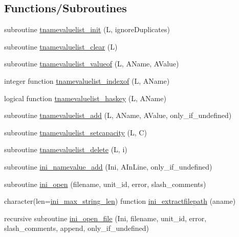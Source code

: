 \subsection*{Functions/\+Subroutines}
\begin{DoxyCompactItemize}
\item 
subroutine \mbox{\hyperlink{namespaceinifile_a1b5283277321bb0c12d8495bd16c23be}{tnamevaluelist\+\_\+init}} (L, ignore\+Duplicates)
\item 
subroutine \mbox{\hyperlink{namespaceinifile_a06106a843a985f0a3a97ecff6fb2b339}{tnamevaluelist\+\_\+clear}} (L)
\item 
subroutine \mbox{\hyperlink{namespaceinifile_a7381759693093e431b8e0aabf6e4b0f2}{tnamevaluelist\+\_\+valueof}} (L, A\+Name, A\+Value)
\item 
integer function \mbox{\hyperlink{namespaceinifile_a040f1b3c4c75c262385aa1452ec39343}{tnamevaluelist\+\_\+indexof}} (L, A\+Name)
\item 
logical function \mbox{\hyperlink{namespaceinifile_af36608910f6418a922996326dd9a97e3}{tnamevaluelist\+\_\+haskey}} (L, A\+Name)
\item 
subroutine \mbox{\hyperlink{namespaceinifile_a71aeaf793bb8c4435154a6e8e52bdfaf}{tnamevaluelist\+\_\+add}} (L, A\+Name, A\+Value, only\+\_\+if\+\_\+undefined)
\item 
subroutine \mbox{\hyperlink{namespaceinifile_a761b93f34948645a73d7311a0dd5f833}{tnamevaluelist\+\_\+setcapacity}} (L, C)
\item 
subroutine \mbox{\hyperlink{namespaceinifile_afbd40722f8a5cfa2f23ed35ed7645466}{tnamevaluelist\+\_\+delete}} (L, i)
\item 
subroutine \mbox{\hyperlink{namespaceinifile_a609f356a961dccd80c9ae97cef1ec582}{ini\+\_\+namevalue\+\_\+add}} (Ini, A\+In\+Line, only\+\_\+if\+\_\+undefined)
\item 
subroutine \mbox{\hyperlink{namespaceinifile_a02e6bd0abca420cf13df98658ac047ba}{ini\+\_\+open}} (filename, unit\+\_\+id, error, slash\+\_\+comments)
\item 
character(len=\mbox{\hyperlink{namespaceinifile_a32faebf83b580d14b5af965dcb4eebfd}{ini\+\_\+max\+\_\+string\+\_\+len}}) function \mbox{\hyperlink{namespaceinifile_a363a92da96b45fce841b0f4dfb2f3fd9}{ini\+\_\+extractfilepath}} (aname)
\item 
recursive subroutine \mbox{\hyperlink{namespaceinifile_a18f4ff3cc821f6e027b4aefa829f4b41}{ini\+\_\+open\+\_\+file}} (Ini, filename, unit\+\_\+id, error, slash\+\_\+comments, append, only\+\_\+if\+\_\+undefined)

\end{DoxyCompactItemize}
